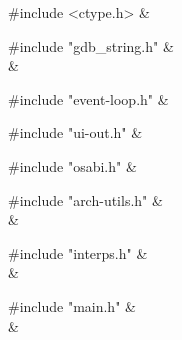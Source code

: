 \medskip
\begin{cxreftabi}
{\stt \#include <ctype.h>} &\\
\end{cxreftabi}

\medskip
\begin{cxreftabi}
{\stt \#include "gdb\_string.h"} &\\
\hspace*{0.2in}{\stt \#include <string.h>} &\\
\end{cxreftabi}

\medskip
\begin{cxreftabi}
{\stt \#include "event-loop.h"} &\\
\end{cxreftabi}

\medskip
\begin{cxreftabi}
{\stt \#include "ui-out.h"} &\\
\end{cxreftabi}

\medskip
\begin{cxreftabi}
{\stt \#include "osabi.h"} &\\
\end{cxreftabi}

\medskip
\begin{cxreftabi}
{\stt \#include "arch-utils.h"} &\\
\hspace*{0.2in}{\stt \#include "../include/ansidecl.h"} &\\
\end{cxreftabi}

\medskip
\begin{cxreftabi}
{\stt \#include "interps.h"} &\\
\hspace*{0.2in}{\stt \#include "exceptions.h"} &\\
\end{cxreftabi}

\medskip
\begin{cxreftabi}
{\stt \#include "main.h"} &\\
\hspace*{0.2in}{\stt \#include "../include/ansidecl.h"} &\\
\end{cxreftabi}

